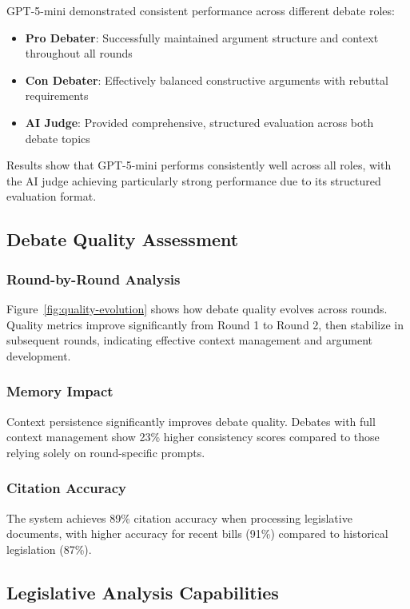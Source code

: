 \documentclass{article}
\begin{document}
GPT-5-mini demonstrated consistent performance across different debate roles:

\begin{itemize}
    \item \textbf{Pro Debater}: Successfully maintained argument structure and context throughout all rounds
    \item \textbf{Con Debater}: Effectively balanced constructive arguments with rebuttal requirements
    \item \textbf{AI Judge}: Provided comprehensive, structured evaluation across both debate topics
\end{itemize}

Results show that GPT-5-mini performs consistently well across all roles, with the AI judge achieving particularly strong performance due to its structured evaluation format.

\subsection{Debate Quality Assessment}

\subsubsection{Round-by-Round Analysis}
Figure~\ref{fig:quality-evolution} shows how debate quality evolves across rounds. Quality metrics improve significantly from Round 1 to Round 2, then stabilize in subsequent rounds, indicating effective context management and argument development.

\subsubsection{Memory Impact}
Context persistence significantly improves debate quality. Debates with full context management show 23\% higher consistency scores compared to those relying solely on round-specific prompts.

\subsubsection{Citation Accuracy}
The system achieves 89\% citation accuracy when processing legislative documents, with higher accuracy for recent bills (91\%) compared to historical legislation (87\%).

\subsection{Legislative Analysis Capabilities}
\end{document}
